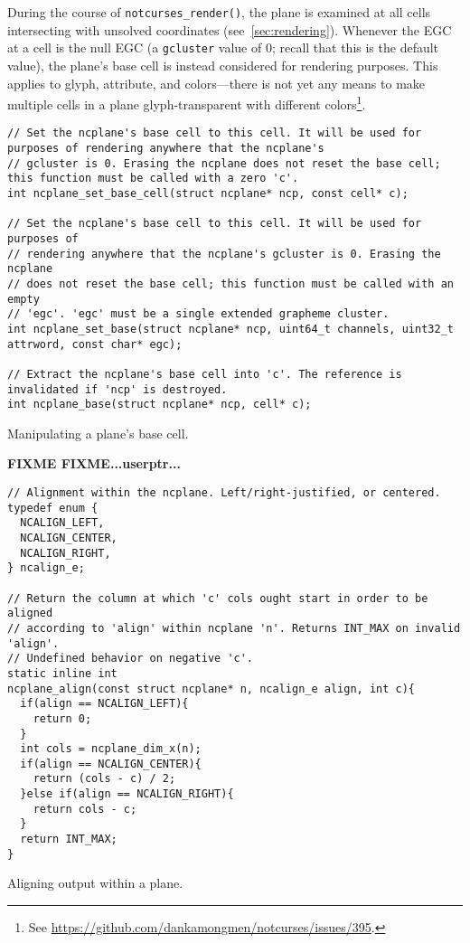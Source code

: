 During the course of \texttt{notcurses\_render()}, the plane is examined at
all cells intersecting with unsolved coordinates (see~\ref{sec:rendering}).
Whenever the EGC at a cell is the null EGC (a \texttt{gcluster} value of 0;
recall that this is the default value), the plane's base cell is instead
considered for rendering purposes. This applies to glyph, attribute, and
colors---there is not yet any means to make multiple cells in a plane glyph-transparent
with different colors\footnote{See \url{https://github.com/dankamongmen/notcurses/issues/395}.}.

\begin{listing}[!htbp]
\begin{verbatim}
// Set the ncplane's base cell to this cell. It will be used for purposes of rendering anywhere that the ncplane's
// gcluster is 0. Erasing the ncplane does not reset the base cell; this function must be called with a zero 'c'.
int ncplane_set_base_cell(struct ncplane* ncp, const cell* c);

// Set the ncplane's base cell to this cell. It will be used for purposes of
// rendering anywhere that the ncplane's gcluster is 0. Erasing the ncplane
// does not reset the base cell; this function must be called with an empty
// 'egc'. 'egc' must be a single extended grapheme cluster.
int ncplane_set_base(struct ncplane* ncp, uint64_t channels, uint32_t attrword, const char* egc);

// Extract the ncplane's base cell into 'c'. The reference is invalidated if 'ncp' is destroyed.
int ncplane_base(struct ncplane* ncp, cell* c);
\end{verbatim}
\caption{Manipulating a plane's base cell.}
\end{listing}

\textbf{FIXME FIXME...userptr...}

\begin{listing}[!htbp]
\begin{verbatim}
// Alignment within the ncplane. Left/right-justified, or centered.
typedef enum {
  NCALIGN_LEFT,
  NCALIGN_CENTER,
  NCALIGN_RIGHT,
} ncalign_e;

// Return the column at which 'c' cols ought start in order to be aligned
// according to 'align' within ncplane 'n'. Returns INT_MAX on invalid 'align'.
// Undefined behavior on negative 'c'.
static inline int
ncplane_align(const struct ncplane* n, ncalign_e align, int c){
  if(align == NCALIGN_LEFT){
    return 0;
  }
  int cols = ncplane_dim_x(n);
  if(align == NCALIGN_CENTER){
    return (cols - c) / 2;
  }else if(align == NCALIGN_RIGHT){
    return cols - c;
  }
  return INT_MAX;
}
\end{verbatim}
\caption{Aligning output within a plane.}
\end{listing}

